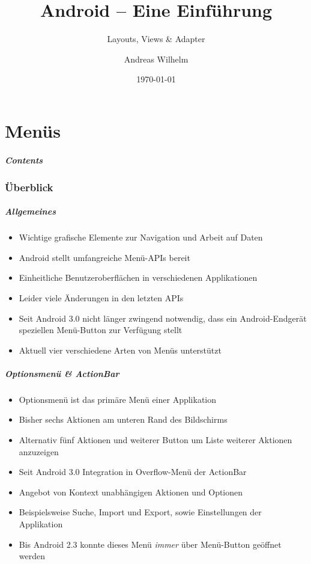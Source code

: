 \title{Android -- Eine Einführung}
\subtitle{Layouts, Views \& Adapter}
\author[A. Wilhelm]{Andreas Wilhelm}
\titlegraphic{}
\date{\today}

\begin{frame}[plain]
  \titlepage
\end{frame}

\part{Menüs}
\frame{\partpage}
\begin{frame}
	\frametitle{Contents}
	\tableofcontents[]
\end{frame}

\section{Überblick}
\begin{frame}
   \frametitle{Allgemeines}
   \begin{itemize}
      \item Wichtige grafische Elemente zur Navigation und Arbeit auf Daten
      \item Android stellt umfangreiche Menü-APIs bereit
      \item Einheitliche Benutzeroberflächen in verschiedenen Applikationen
      \item Leider viele Änderungen in den letzten APIs
      \item Seit Android 3.0 nicht länger zwingend notwendig, dass ein Android-Endgerät 
         speziellen Menü-Button zur Verfügung stellt
      \item Aktuell vier verschiedene Arten von Menüs unterstützt
   \end{itemize}
\end{frame}

\begin{frame}
   \frametitle{Optionsmenü \& ActionBar}
   \begin{itemize}
      \item Optionsmenü ist das primäre Menü einer Applikation
      \item Bisher sechs Aktionen am unteren Rand des Bildschirms
      \item Alternativ fünf Aktionen und weiterer Button um Liste weiterer Aktionen anzuzeigen
      \item Seit Android 3.0 Integration in Overflow-Menü der ActionBar
      \item Angebot von Kontext unabhängigen Aktionen und Optionen
      \item Beispielsweise Suche, Import und Export, sowie Einstellungen der Applikation
      \item Bis Android 2.3 konnte dieses Menü \emph{immer} über Menü-Button geöffnet werden
   \end{itemize}
\end{frame}

